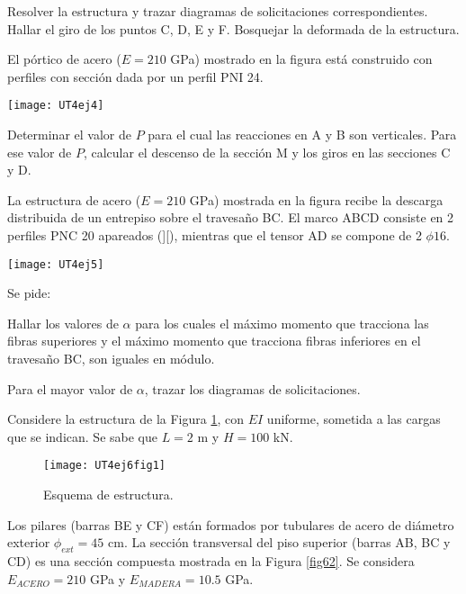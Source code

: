\parte Resolver la estructura y trazar diagramas de solicitaciones correspondientes.
\parte Hallar el giro de los puntos C, D, E y F. Bosquejar la deformada de la estructura.

\ejercicio

El pórtico de acero ($E=210$ GPa) mostrado en la figura está construido con perfiles con sección dada por un perfil PNI 24.

\begin{center}
	\texttt{[image: UT4ej4]}
\end{center}

\parte Determinar el valor de $P$  para el cual las reacciones en A y B son verticales.
\parte Para ese valor de $P$, calcular el descenso de la sección M y los giros en las secciones C y  D.

\ejercicio

La estructura de acero ($E=210$ GPa) mostrada en la figura recibe la descarga distribuida de un entrepiso sobre el travesaño BC. El marco ABCD consiste en 2 perfiles PNC 20 apareados (][), mientras que el tensor AD se compone de 2 $\phi 16$.

\begin{center}
	\texttt{[image: UT4ej5]}
\end{center}

Se pide:

\parte Hallar los valores de $\alpha$ para los cuales el máximo momento que tracciona las fibras superiores y el máximo momento que tracciona fibras inferiores en el travesaño BC, son iguales en módulo. 

\parte Para el mayor valor de $\alpha$, trazar los diagramas de solicitaciones.

\ejercicio

Considere la estructura de la Figura \ref{fig61}, con $EI$ uniforme, sometida a las cargas que se indican. Se sabe que $L=2$ m y $H= 100$ kN. %
%

\begin{figure}[htb]
	\centering
\texttt{[image: UT4ej6fig1]}
\caption{Esquema de estructura.}
\label{fig61}
\end{figure}

Los pilares (barras BE y CF) están formados por tubulares de acero de diámetro exterior $\phi_{ext} = 45$ cm. %
%
La sección transversal del piso superior (barras AB, BC y CD) es una sección compuesta mostrada en la Figura \ref{fig62}. %
%
Se considera $E_{ACERO} = 210$ GPa y $E_{MADERA} = 10.5$ GPa.

